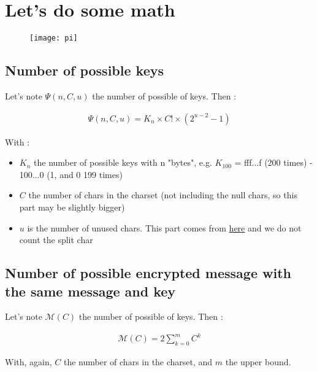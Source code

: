 \section{Let's do some math}

\begin{figure}[H]
    \centering
    \texttt{[image: pi]}
\end{figure}

\subsection{Number of possible keys}
    
Let's note $\Psi(n,C,u)$ the number of possible of keys. Then :
\begin{large}
\begin{align}
    \Psi(n,C,u) = K_n \times C! \times (2^{u-2}-1)
\end{align}
\end{large}
With :
\begin{itemize}
    \item $K_{n}$ the number of possible keys with n "bytes", e.g. $K_{100}$ = fff...f (200 times) - 100...0 (1, and 0 199 times)
    \item $C$ the number of chars in the charset (not including the null chars, so this part may be slightly bigger)
    \item $u$ is the number of unused chars. This part comes from 
                \href{https://math.stackexchange.com/questions/3340723/how-many-ways-to-partition-n-elements-into-two-nonempty-subsets}{here} 
          and we do not count the split char
    
\end{itemize}

\subsection{Number of possible encrypted message with the same message and key}

Let's note $\mathcal{M}(C)$ the number of possible of keys. Then :
\begin{large}
\begin{align}
    \mathcal{M}(C) = 2 \sum_{k=0}^{m}{C^k} 
\end{align}
\end{large}
With, again, $C$ the number of chars in the charset, and $m$ the upper bound.